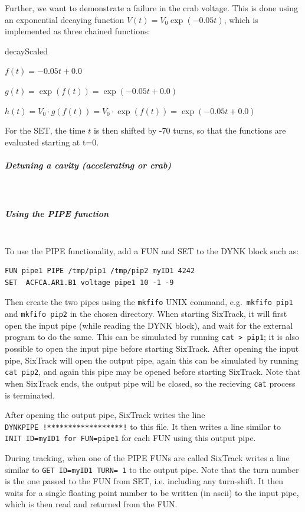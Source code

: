 Further, we want to demonstrate a failure in the crab voltage.
This is done using an exponential decaying function $V(t) = V_0 \exp\left(-0.05 t\right)$, which is implemented as three chained functions:
\begin{description_alligned}{decayScaled}
\item[expCore] $f(t) = -0.05 t + 0.0$
\item[decay] $g(t) = \exp(f(t)) = \exp(-0.05 t + 0.0)$
\item[decayScaled] $h(t) = V_0 \cdot g(f(t)) = V_0 \cdot \exp(f(t)) = \exp(-0.05 t + 0.0)$
\end{description_alligned}
For the SET, the time $t$ is then shifted by -70 turns, so that the functions are evaluated starting at t=0.

\subparagraph{Detuning a cavity (accelerating or crab)}~\\

\subparagraph{Using the PIPE function}~\\

To use the PIPE functionality, add a FUN and SET to the DYNK block such as:
\begin{verbatim}
FUN pipe1 PIPE /tmp/pip1 /tmp/pip2 myID1 4242
SET  ACFCA.AR1.B1 voltage pipe1 10 -1 -9
\end{verbatim}
Then create the two pipes using the \texttt{mkfifo} UNIX command, e.g.\ \texttt{mkfifo~pip1} and \texttt{mkfifo~pip2} in the chosen directory.
When starting SixTrack, it will first open the input pipe (while reading the DYNK block), and wait for the external program to do the same.
This can be simulated by running \texttt{cat~>~pip1}; it is also possible to open the input pipe before starting SixTrack.
After opening the input pipe, SixTrack will open the output pipe, again this can be simulated by running \texttt{cat~pip2}, and again this pipe may be opened before starting SixTrack.
Note that when SixTrack ends, the output pipe will be closed, so the recieving \texttt{cat} process is terminated.

After opening the output pipe, SixTrack writes the line \texttt{DYNKPIPE~!******************!} to this file.
It then writes a line similar to \texttt{INIT~ID=myID1~for~FUN=pipe1} for each FUN using this output pipe.

During tracking, when one of the PIPE FUNs are called SixTrack writes a line similar to \texttt{GET ID=myID1 TURN=~1} to the output pipe.
Note that the turn number is the one passed to the FUN from SET, i.e. including any turn-shift.
It then waits for a single floating point number to be written (in ascii) to the input pipe, which is then read and returned from the FUN.

